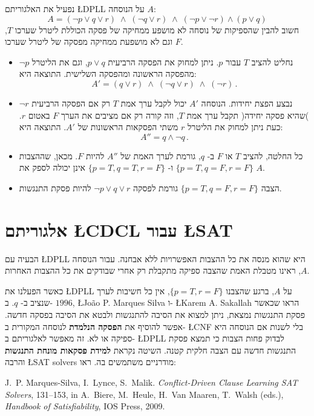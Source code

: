 \documentclass[12pt,a4paper]{article}
\newcommand*{\ngg}{\mathop{\neg}}
\begin{document}
נפעיל את האלגוריתם
\L{DPLL}
על הנוסחה
$A$:
\[
A=(\ngg p \vee q \vee r) \;\wedge\; (\ngg q \vee r) \;\wedge\; (\ngg p \vee\ngg r) \wedge (p \vee q)
\]
חשוב להבין שהספיקות של נוסחה לא מושפע ממחיקה של פסקה הכוללת ליטרל שערכו
$T$,
וגם לא מושפעת ממחיקה מפסקה של ליטרל שערכו
$F$.
\begin{itemize}
\item
נחליט להציב 
$T$
עבור
$p$.
ניתן למחוק את הפסקה הרביעית
$p \vee q$,
וגם את הליטרל
$\ngg p$
מהפסקה הראשונה ומהפסקה השלישית. התוצאה היא:
\[
A'=(q \vee r) \;\wedge\; (\ngg q \vee r) \;\wedge\; (\ngg r)\,.
\]
\item
נבצע הפצת יחידות. הנוסחה 
$A'$
יכול לקבל ערך אמת
$T$
רק אם הפסקה הרביעית
$\ngg r$
)שהיא פסקה יחידה( תקבל ערך אמת
$T$,
וזה קורה רק אם מציבים את הערך
$F$
באטום
$r$.
כעת ניתן למחוק את הליטרל
$r$
משתי הפסקאות הראשונות של
$A'$.
התוצאה היא:
\[
A'' = q \wedge \ngg q\,.
\]
\item
כל החלטה, להציב
$T$
או
$F$
ב-%
$q$,
גורמת לערך האמת של 
$A''$
להיות
$F$.
מכאן, שההצבות 
$\{p=T, q=F, r=F\}$
ו-%
$\{p=T, q=T, r=F\}$
אינן יכולה לספק את
$A$.
\item
הצבה
$\{p=T, q=F, r=F\}$
גורמת לפסקה
$\ngg p \vee q \vee r$
להיות פסקת התנגשות.
\end{itemize}

\section{אלגוריתם \L{CDCL} עבור \L{SAT}}

הבעיה עם
\L{DPLL}
היא שהוא מנסה את כל ההצבות האפשרויות ללא אבחנה. עבור הנוסחה 
$A$,
ראינו מטבלת האמת שהצבה ספיקה מתקבלת רק אחרי שבודקים את כל ההצבות האחרות.

כאשר הפעלנו את
\L{DPLL}
על
$A$,
ברגע שהצבנו
$\{p=T,r=F\}$,
אין כל חשיבות לערך שנציב ב-%
$q$.
ב-%
$1996$,
\L{Jo\~{a}o P. Marques Silva}
ו-%
\L{Karem A. Sakallah}
הראו שכאשר פסקת התנגשות נמצאת, ניתן למצוא את הסיבה להתנגשות ולבטא את הסיבה בפסקה חדשה. אפשר להוסיף את
\textbf{הפסקה הנלמדת}
לנוסחה המקורית ב-%
\L{CNF}
בלי לשנות אם הנוסחה היא ספיקה או לא. זה מאפשר לאלגוריתם ב-%
\L{DPLL}
לבדוק פחות הצבות כי תמצא פסקת התנגשות חדשה עם הצבה חלקית קטנה. השיטה נקראת
\textbf{למידת פסקאות מונחת התנגשות}
והרבה 
\L{SAT solvers}
מודרניים משתמשים בה. ראו:

J.~P. Marques-Silva, I.~Lynce, S.~Malik. {\em Conflict-Driven Clause Learning SAT Solvers}, 131--153, in A.~Biere, M.~Heule, H.~Van Maaren, T.~Walsh (eds.), {\em Handbook of Satisfiability}, IOS Press, 2009.
\end{document}
